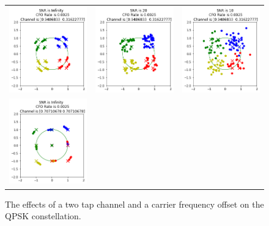\setlength{\tabcolsep}{0pt}
\begin{figure}
  \centering
  \caption{The effects of a two tap channel and a carrier frequency offset on the QPSK constellation.}
  \begin{tabular}{ccc}
    \includegraphics[width=45mm]{figures/cfo_equal_intro/snr_0_c3/cfo_0.png}&
    \includegraphics[width=45mm]{figures/cfo_equal_intro/snr_20_c3/cfo_0.png}&
    \includegraphics[width=45mm]{figures/cfo_equal_intro/snr_10_c3/cfo_0.png}\\
    \includegraphics[width=45mm]{figures/cfo_equal_intro/snr_0_c2/cfo_0.png}&

\end{tabular}
\end{figure}
